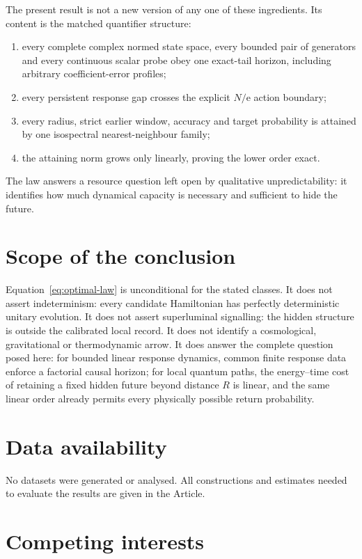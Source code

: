 \documentclass[10pt]{article}
\numberwithin{equation}{section}
\theoremstyle{definition}
\theoremstyle{remark}
\newcommand{\ee}{\mathrm e}
\begin{document}
The present result is not a new version of any one of these ingredients.
Its content is the matched quantifier structure:
\begin{enumerate}
\item every complete complex normed state space, every bounded pair of
generators and every continuous scalar probe obey one exact-tail horizon,
including arbitrary coefficient-error profiles;
\item every persistent response gap crosses the explicit \(N/\ee\) action
boundary;
\item every radius, strict earlier window, accuracy and target probability
is attained by one isospectral nearest-neighbour family;
\item the attaining norm grows only linearly, proving the lower order exact.
\end{enumerate}
The law answers a resource question left open by qualitative
unpredictability: it identifies how much dynamical capacity is necessary
and sufficient to hide the future.

\section{Scope of the conclusion}

Equation~\eqref{eq:optimal-law} is unconditional for the stated classes.
It does not assert indeterminism: every candidate Hamiltonian has perfectly
deterministic unitary evolution.  It does not assert superluminal signalling:
the hidden structure is outside the calibrated local record.  It does not
identify a cosmological, gravitational or thermodynamic arrow.  It does
answer the complete question posed here: for bounded linear response
dynamics, common finite response data enforce a factorial causal horizon;
for local quantum paths, the energy--time cost of retaining a fixed hidden
future beyond distance \(R\) is linear, and the same linear order already
permits every physically possible return probability.

\section*{Data availability}

No datasets were generated or analysed.  All constructions and estimates
needed to evaluate the results are given in the Article.

\section*{Competing interests}
\end{document}
